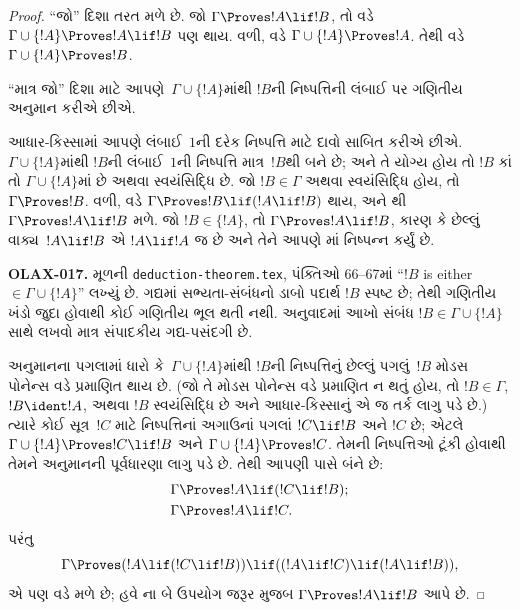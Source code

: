 \begin{proof}
``જો'' દિશા તરત મળે છે. જો $\Gamma \Proves !A \lif !B$, તો
 વડે $\Gamma \cup \{!A\} \Proves !A \lif
!B$ પણ થાય. વળી,  વડે
$\Gamma \cup \{!A\} \Proves !A$. તેથી  વડે
$\Gamma \cup \{!A\} \Proves !B$.

``માત્ર જો'' દિશા માટે આપણે~$\Gamma \cup \{!A\}$માંથી $!B$ની
નિષ્પત્તિની લંબાઈ પર ગણિતીય અનુમાન કરીએ છીએ.

આધાર-કિસ્સામાં આપણે લંબાઈ~$1$ની દરેક નિષ્પત્તિ માટે દાવો સાબિત
કરીએ છીએ. $\Gamma \cup \{!A\}$માંથી $!B$ની લંબાઈ~$1$ની
નિષ્પત્તિ માત્ર~$!B$થી બને છે; અને તે યોગ્ય હોય તો $!B$ કાં તો
$\Gamma \cup \{!A\}$માં છે અથવા સ્વયંસિદ્ધિ છે. જો $!B \in \Gamma$
અથવા સ્વયંસિદ્ધિ હોય, તો $\Gamma \Proves !B$. વળી,
 વડે $\Gamma \Proves !B \lif (!A \lif !B)$ થાય,
અને થી $\Gamma \Proves !A \lif !B$ મળે. જો
$!B \in \{!A\}$, તો $\Gamma \Proves !A \lif !B$, કારણ કે છેલ્લું
વાક્ય~$!A \lif !B$ એ $!A \lif !A$ જ છે અને તેને આપણે
માં નિષ્પન્ન કર્યું છે.

\begin{editorial}
\textbf{OLAX-017.} મૂળની \texttt{deduction-theorem.tex}, પંક્તિઓ 66--67માં “$!B$ is either $\in\Gamma\cup\{!A\}$” લખ્યું છે. ગદ્યમાં સભ્યતા-સંબંધનો ડાબો પદાર્થ $!B$ સ્પષ્ટ છે; તેથી ગણિતીય ખંડો જુદા હોવાથી કોઈ ગણિતીય ભૂલ થતી નથી. અનુવાદમાં આખો સંબંધ $!B\in\Gamma\cup\{!A\}$ સાથે લખવો માત્ર સંપાદકીય ગદ્ય-પસંદગી છે.
\end{editorial}

અનુમાનના પગલામાં ધારો કે~$\Gamma \cup \{!A\}$માંથી $!B$ની
નિષ્પત્તિનું છેલ્લું પગલું~$!B$ મોડસ પોનેન્સ વડે પ્રમાણિત થાય છે.
(જો તે મોડસ પોનેન્સ વડે પ્રમાણિત ન થતું હોય, તો $!B \in \Gamma$,
$!B \ident !A$, અથવા $!B$ સ્વયંસિદ્ધિ છે અને આધાર-કિસ્સાનું એ જ તર્ક
લાગુ પડે છે.) ત્યારે કોઈ સૂત્ર~$!C$ માટે નિષ્પત્તિનાં અગાઉનાં
પગલાં $!C \lif !B$ અને $!C$ છે; એટલે
$\Gamma \cup \{!A\} \Proves !C \lif !B$ અને
$\Gamma \cup \{!A\} \Proves !C$. તેમની નિષ્પત્તિઓ ટૂંકી હોવાથી
તેમને અનુમાનની પૂર્વધારણા લાગુ પડે છે. તેથી આપણી પાસે બંને છે:
\begin{align*}
  & \Gamma \Proves !A \lif (!C \lif !B); \\
  & \Gamma \Proves !A \lif !C.
\end{align*}
પરંતુ
\[
\Gamma \Proves (!A \lif (!C \lif !B)) \lif
((!A\lif !C)  \lif (!A \lif !B)),
\]
એ પણ  વડે મળે છે; હવે ના બે ઉપયોગ
જરૂર મુજબ $\Gamma \Proves !A \lif !B$ આપે છે.
\end{proof}

